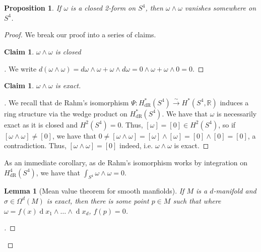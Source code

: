 \documentclass[english]{article}
\renewcommand{\d}[1]{\ensuremath{\operatorname{d}\!{#1}}}
\newcommand{\RR}{\mathbb{R}}
\newenvironment{subproof}[1][\proofname]{%
	\renewcommand{\qedsymbol}{$\blacksquare$}%
	\begin{proof}[#1]%
	}{%
	\end{proof}%
}
\newcommand{\prob}[1]{\setcounter{section}{#1-1}\section{}}
\newcommand{\prt}[1]{\setcounter{subsection}{#1-1}\subsection{}}
\newtheorem{lemma}[theorem]{Lemma}
\newtheorem*{proposition*}{Proposition}
\newtheorem{claim}[theorem]{Claim}
\theoremstyle{remark}
\theoremstyle{definition}
\newcommand{\hdr}{H_{\mathrm{dR}}}
\newcommand{\tosm}{\xrightarrow{\sim}}
\begin{document}
\prob{3}
\begin{proposition*}
	If $\omega$ is a closed 2-form on $S^4$, then $\omega\wedge\omega$ vanishes somewhere on $S^4$.
\end{proposition*}
\begin{proof}
We break our proof into a series of claims.\begin{claim}
	$\omega \wedge \omega$ is closed
\end{claim}
\begin{subproof}
We write $d(\omega\wedge \omega)=d\omega\wedge \omega+\omega\wedge d\omega=0\wedge\omega +\omega \wedge 0=0.$
\end{subproof}
\begin{claim}
$\omega \wedge \omega$ is exact.
\end{claim}
\begin{subproof}
	We recall that de Rahm's isomorphism $\Psi:\hdr^*(S^4)\tosm H^*(S^4,\RR)$ induces a ring structure via the wedge product on $\hdr^*(S^4)$. We have that $\omega$ is necessarily exact as it is closed and $H^2(S^4)=0$. Thus, $[\omega]=[0]\in H^2(S^4)$, so if $[\omega\wedge\omega]\neq [0]$, we have that $0\neq[\omega\wedge\omega]= [\omega]\wedge [\omega]=[0]\wedge [0]=[0]$, a contradiction. Thus, $[\omega\wedge\omega]=[0]$ indeed, i.e. $\omega\wedge\omega$ is exact.
\end{subproof}
As an immediate corollary, as de Rahm's isomorphism works by integration on $\hdr^4(S^4)$, we have that $\int_{S^4}\omega \wedge \omega=0$.
\begin{lemma}[Mean value theorem for smooth manfiolds]
	If $M$ is a $d$-manifold and $\sigma\in\Omega^d(M)$ is exact, then there is some point $p\in M$ such that where $\omega=f(x)\d x_1\wedge \dots \wedge\d x_d$, $f(p)=0$. 
\end{lemma}
\begin{subproof}
\end{subproof}
\end{proof}
\prob{4}
\prt{1}
\prt{2}
\prob{5}
\end{document}
